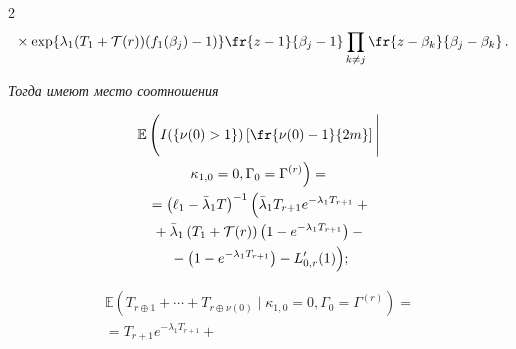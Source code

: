 \begin{multicols}{2}
\begin{multline*}
    {}\times

    \exp\{\lambda_{1}(T_{1}+\mathcal T(r))(f_{1}(\beta_{j})-1)\}

    \fr{z-1}{\beta_{j}-1}\prod\limits_{k\neq j}\fr{z-\beta_{k}}{\beta_{j}-\beta_{k}}\,.\hspace*{-2.84pt}

\end{multline*}

\textit{Тогда имеют место соотношения}



\noindent

  \begin{multline*}

    \mathbb E  \left(  I(\{\nu(0) >1\})  \left[ \fr{\nu(0)-1}{2m} \right] 

\Bigg\vert \right.\\

\left. \kappa_{1,0}=0, \Gamma_0=\Gamma^{(r)} 

\vphantom{\fr{\nu(0)-1}{2m}}

\right) ={}\\

{}=

  \left(\ell_1-\bar\lambda_1 T\right)^{-1}  \Big( \bar\lambda_1 T_{r+1} e^{-\lambda_1

      T_{r+1}} +{}\\

      {}+ \bar\lambda_1 \left(T_1+\mathcal T(r)\right)\left(1-e^{-\lambda_1 T_{r+1}}\right)

    -{}\\

 {}-\left(1-e^{-\lambda_1 T_{r+1}}\right)-L_{0,r}'(1)    \Big);


  \end{multline*}

  

  \vspace*{-12pt}

  

  \noindent

  \begin{multline*}

    \mathbb {E}\left(  T_{r\oplus1} +\cdots+T_{r\oplus \nu(0)}\mid \kappa_{1,0}=0,

    \Gamma_0=\Gamma^{(r)}\right)={}\\

    {}= T_{r+1} e^{-\lambda_1 T_{r+1}} +


\end{multline*}
\end{multicols}
